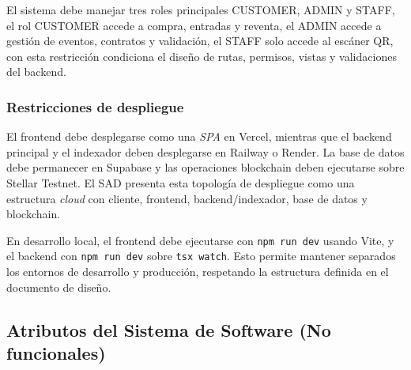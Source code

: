 \documentclass[12pt,letterpaper]{article}
\begin{document}
El sistema debe manejar tres roles principales CUSTOMER, ADMIN y STAFF, el rol CUSTOMER accede a compra, entradas y reventa, el ADMIN accede a gestión de eventos, contratos y validación, el STAFF solo accede al escáner QR, con esta restricción condiciona el diseño de rutas, permisos, vistas y validaciones del backend.

\subsubsection{Restricciones de despliegue}
El frontend debe desplegarse como una \textit{SPA} en Vercel, mientras que el
backend principal y el indexador deben desplegarse en Railway o Render. La base
de datos debe permanecer en Supabase y las operaciones blockchain deben
ejecutarse sobre Stellar Testnet. El SAD presenta esta topología de despliegue como
una estructura \textit{cloud} con cliente, frontend, backend/indexador, base de
datos y blockchain.

En desarrollo local, el frontend debe ejecutarse con \texttt{npm run dev} usando
Vite, y el backend con \texttt{npm run dev} sobre \texttt{tsx watch}. Esto permite
mantener separados los entornos de desarrollo y producción, respetando la
estructura definida en el documento de diseño.

\subsection{Atributos del Sistema de Software (No funcionales)}
\end{document}
